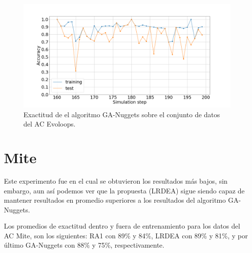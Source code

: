 \begin{figure}[H]
	\centering
	\includegraphics[width=\linewidth]{fig/GA-nuggets_8}
	\caption{Exactitud de el algoritmo GA-Nuggets sobre el conjunto de datos del AC Evoloops.}
	\label{fig:ganuggetsevoloops}
\end{figure}

\section{Mite}
Este experimento fue en el cual se obtuvieron los resultados más bajos, sin embargo, aun así podemos ver que la propuesta (LRDEA) sigue siendo capaz de mantener resultados en promedio superiores a los resultados del algoritmo GA-Nuggets.

Los promedios de exactitud dentro y fuera de entrenamiento para los datos del AC Mite, son los siguientes: RA1 con 89\% y 84\%, LRDEA con 89\% y 81\%, y por último GA-Nuggets con 88\% y 75\%, respectivamente.

